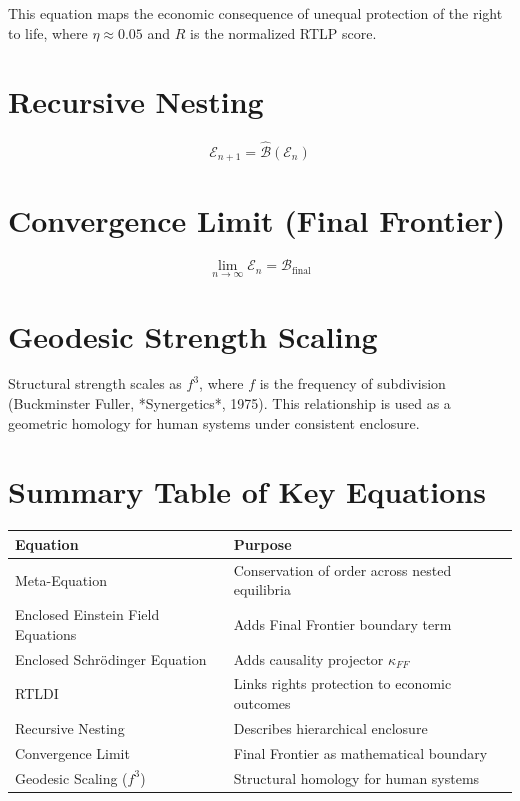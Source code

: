 This equation maps the economic consequence of unequal protection of the right to life, where $\eta \approx 0.05$ and $R$ is the normalized RTLP score.

\section{Recursive Nesting}

\begin{equation}
\mathcal{E}_{n+1} = \hat{\mathcal{B}}(\mathcal{E}_n)
\end{equation}

\section{Convergence Limit (Final Frontier)}

\begin{equation}
\lim_{n \to \infty} \mathcal{E}_n = \mathcal{B}_{\text{final}}
\end{equation}

\section{Geodesic Strength Scaling}

Structural strength scales as $f^3$, where $f$ is the frequency of subdivision (Buckminster Fuller, *Synergetics*, 1975). This relationship is used as a geometric homology for human systems under consistent enclosure.

\section{Summary Table of Key Equations}

\begin{center}
\begin{tabular}{>{\raggedright\arraybackslash}p{5.5cm} >{\raggedright\arraybackslash}p{6.5cm}}
\toprule
\textbf{Equation} & \textbf{Purpose} \\
\midrule
Meta-Equation & Conservation of order across nested equilibria \\
Enclosed Einstein Field Equations & Adds Final Frontier boundary term \\
Enclosed Schrödinger Equation & Adds causality projector $\kappa_{FF}$ \\
RTLDI & Links rights protection to economic outcomes \\
Recursive Nesting & Describes hierarchical enclosure \\
Convergence Limit & Final Frontier as mathematical boundary \\
Geodesic Scaling ($f^3$) & Structural homology for human systems \\
\bottomrule
\end{tabular}
\end{center}

